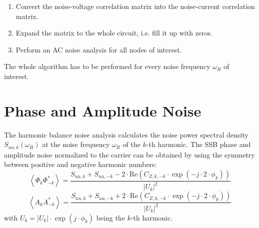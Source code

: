\begin{enumerate}
\item Convert the noise-voltage correlation matrix into the noise-current
   correlation matrix.
\item Expand the matrix to the whole circuit, i.e. fill it up with zeros.
\item Perform an AC noise analysis for all nodes of interest.
\end{enumerate}

The whole algorithm has to be performed for every noise frequency
$\omega_R$ of interest.


\section{Phase and Amplitude Noise}

The harmonic balance noise analysis calculates the noise power spectral
density $S_{uu,k}(\omega_R)$ at the noise frequency $\omega_R$ of the
$k$-th harmonic. The SSB phase and amplitude noise normalized to the
carrier can be obtained by using the symmetry between positive and
negative harmonic numbers:
\begin{equation}
\left< \Phi_k \Phi_{-k}^* \right> =
 \dfrac{S_{uu,k} + S_{uu,-k} - 2\cdot \text{Re}\left( C_{Z,k,-k}\cdot\exp(-j\cdot 2\cdot\phi_k) \right)}
       {| U_k |^2}
\end{equation}
\begin{equation}
\left< A_k A_{-k}^* \right> =
 \dfrac{S_{uu,k} + S_{uu,-k} + 2\cdot \text{Re}\left( C_{Z,k,-k}\cdot\exp(-j\cdot 2\cdot\phi_k) \right)}
       {| U_k |^2}
\end{equation}
with $U_k = |U_k| \cdot \exp(j\cdot\phi_k)$ being the $k$-th harmonic.
